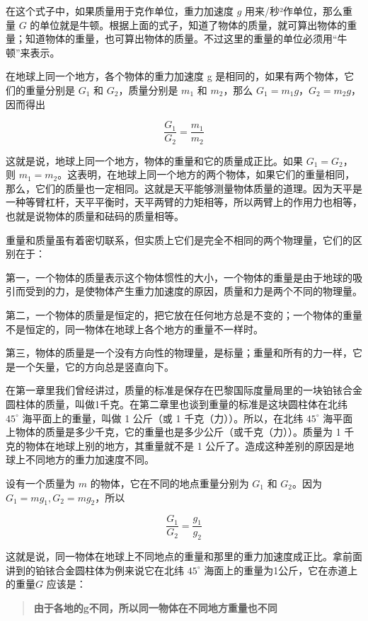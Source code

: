 在这个式子中，如果质量用于克作单位，重力加速度 \(g\)
用来/秒²作单位，那么重量 \(G\)
的单位就是牛顿。根据上面的式子，知道了物体的质量，就可算出物体的重量；知道物体的重量，也可算出物体的质量。不过这里的重量的单位必须用``牛顿''来表示。

在地球上同一个地方，各个物体的重力加速度 g
是相同的，如果有两个物体，它们的重量分别是 \(G_{1}\) 和
\(G_{2}\)，质量分别是 \(m_{1}\) 和 \(m_{2}\)，那么
\(G_{1}=m_{1}g\)，\(G_{2}=m_{2}g\)，因而得出

\[
\frac {G _ {1}}{G _ {2}} = \frac {m _ {1}}{m _ {2}}
\]

这就是说，地球上同一个地方，物体的重量和它的质量成正比。如果
\(G_{1} = G_{2}\)，则
\(m_{1} = m_{2}\)。这表明，在地球上同一个地方的两个物体，如果它们的重量相同，那么，它们的质量也一定相同。这就是天平能够测量物体质量的道理。因为天平是一种等臂杠杆，天平平衡时，天平两臂的力矩相等，所以两臂上的作用力也相等，也就是说物体的质量和砝码的质量相等。

重量和质量虽有着密切联系，但实质上它们是完全不相同的两个物理量，它们的区别在于：

第一，一个物体的质量表示这个物体惯性的大小，一个物体的重量是由于地球的吸引而受到的力，是使物体产生重力加速度的原因，质量和力是两个不同的物理量。

第二，一个物体的质量是恒定的，把它放在任何地方总是不变的；一个物体的重量不是恒定的，同一物体在地球上各个地方的重量不一样时。

第三，物体的质量是一个没有方向性的物理量，是标量；重量和所有的力一样，它是一个矢量，它的方向总是竖直向下。

在第一章里我们曾经讲过，质量的标准是保存在巴黎国际度量局里的一块铂铱合金圆柱体的质量，叫做1千克。在第二章里也谈到重量的标准是这块圆柱体在北纬
\(45^{\circ}\) 海平面上的重量，叫做 1 公斤（或 1
千克（力））。所以，在北纬 \(45^{\circ}\)
海平面上物体的质量是多少千克，它的重量也是多少公斤（或千克（力））。质量为
1 千克的物体在地球上别的地方，其重量就不是 1
公斤了。造成这种差别的原因是地球上不同地方的重力加速度不同。

设有一个质量为 \(m\) 的物体，它在不同的地点重量分别为 \(G_{1}\) 和
\(G_{2}\)。因为 \(G_{1} = mg_{1}, G_{2} = mg_{2}\)，所以

\[
\frac {G _ {1}}{G _ {2}} = \frac {g _ {1}}{g _ {2}}
\]

这就是说，同一物体在地球上不同地点的重量和那里的重力加速度成正比。拿前面讲到的铂铱合金圆柱体为例来说它在北纬
\(45^{\circ}\) 海面上的重量为1公斤，它在赤道上的重量\(G\) 应该是：

\begin{quote}
\textbf{由于各地的g不同，所以同一物体在不同地方重量也不同}
\end{quote}

